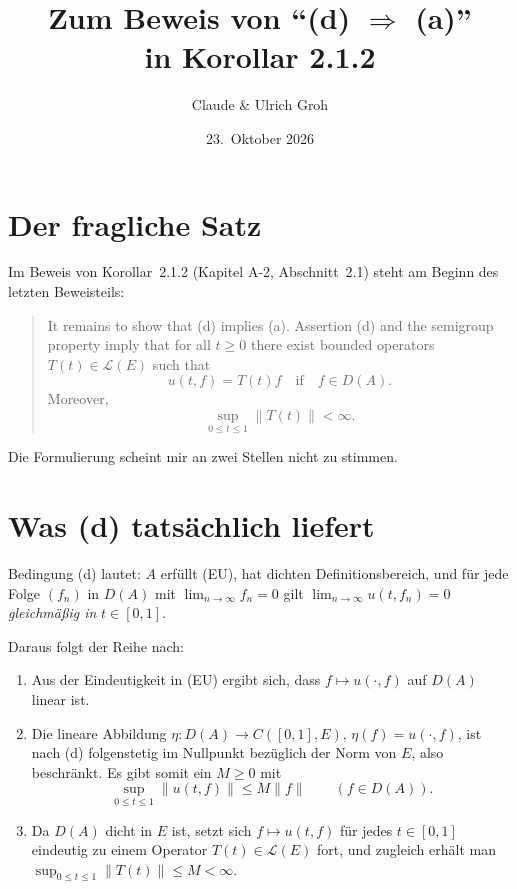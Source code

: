 \documentclass[11pt,a4paper]{article}
\title{Zum Beweis von \enquote{(d) $\Rightarrow$ (a)}\\
       in Korollar 2.1.2}
\author{Claude \& Ulrich Groh}
\date{23.~Oktober 2026}
\newcommand{\LE}{\mathcal{L}(E)}
\begin{document}
\maketitle

\section*{Der fragliche Satz}

Im Beweis von Korollar~2.1.2 (Kapitel A-2, Abschnitt~2.1) steht am
Beginn des letzten Beweisteils:

\begin{quote}
It remains to show that (d) implies (a).
Assertion (d) and the semigroup property imply that for all $t \geq 0$
there exist bounded operators $T(t) \in \LE$ such that
\[
    u(t,f) = T(t)f
    \quad \text{if} \quad
    f \in D(A) .
\]
Moreover,
\[
    \sup_{0 \leq t \leq 1} \|T(t)\| < \infty .
\]
\end{quote}

\noindent
Die Formulierung scheint mir an zwei Stellen nicht zu stimmen.

\section*{Was (d) tatsächlich liefert}

Bedingung (d) lautet: $A$ erfüllt (EU), hat dichten Definitionsbereich,
und für jede Folge $(f_n)$ in $D(A)$ mit $\lim_{n\to\infty} f_n = 0$ gilt
$\lim_{n\to\infty} u(t,f_n) = 0$ \emph{gleichmäßig in} $t \in [0,1]$.

Daraus folgt der Reihe nach:

\begin{enumerate}[label=(\roman*)]
\item Aus der Eindeutigkeit in (EU) ergibt sich, dass
      $f \mapsto u(\cdot,f)$ auf $D(A)$ linear ist.
\item Die lineare Abbildung
      $\eta \colon D(A) \to C([0,1],E)$, $\eta(f) = u(\cdot,f)$,
      ist nach (d) folgenstetig im Nullpunkt bezüglich der Norm von $E$,
      also beschränkt. Es gibt somit ein $M \geq 0$ mit
      \[
          \sup_{0 \leq t \leq 1} \|u(t,f)\| \leq M\|f\|
          \qquad (f \in D(A)).
      \]
\item Da $D(A)$ dicht in $E$ ist, setzt sich $f \mapsto u(t,f)$ für jedes
      $t \in [0,1]$ eindeutig zu einem Operator $T(t) \in \LE$ fort, und
      zugleich erhält man $\sup_{0 \leq t \leq 1}\|T(t)\| \leq M < \infty$.
\end{enumerate}
\end{document}
